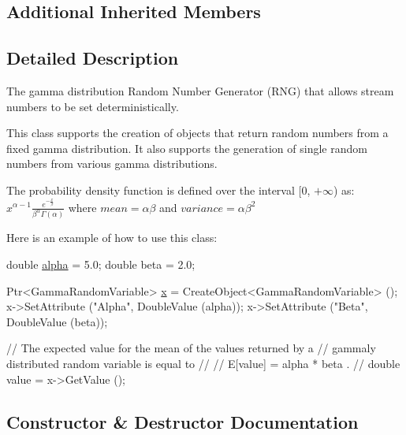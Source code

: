 \subsection*{Additional Inherited Members}


\subsection{Detailed Description}
The gamma distribution Random Number Generator (R\+NG) that allows stream numbers to be set deterministically. 

This class supports the creation of objects that return random numbers from a fixed gamma distribution. It also supports the generation of single random numbers from various gamma distributions.

The probability density function is defined over the interval \mbox{[}0, $+\infty$) as\+: $ x^{\alpha-1} \frac{e^{-\frac{x}{\beta}}}{\beta^\alpha \Gamma(\alpha)}$ where $ mean = \alpha\beta $ and $ variance = \alpha \beta^2$

Here is an example of how to use this class\+: 
\begin{DoxyCode}
\textcolor{keywordtype}{double} \hyperlink{lte__uplink__power__control_8m_a62197192f0fbf4e0675eb37be1c4c175}{alpha} = 5.0;
\textcolor{keywordtype}{double} beta = 2.0;

Ptr<GammaRandomVariable> \hyperlink{lte__link__budget__x2__handover__measures_8m_a9336ebf25087d91c818ee6e9ec29f8c1}{x} = CreateObject<GammaRandomVariable> ();
x->SetAttribute (\textcolor{stringliteral}{"Alpha"}, DoubleValue (alpha));
x->SetAttribute (\textcolor{stringliteral}{"Beta"}, DoubleValue (beta));

\textcolor{comment}{// The expected value for the mean of the values returned by a}
\textcolor{comment}{// gammaly distributed random variable is equal to }
\textcolor{comment}{//}
\textcolor{comment}{//     E[value]  =  alpha * beta  .}
\textcolor{comment}{//}
\textcolor{keywordtype}{double} value = x->GetValue ();
\end{DoxyCode}
 

\subsection{Constructor \& Destructor Documentation}

